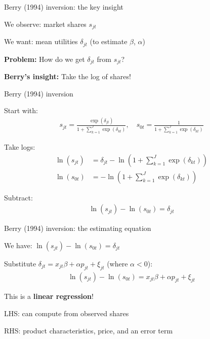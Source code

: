 \documentclass[notes,11pt, aspectratio=169]{beamer}
\newenvironment{wideitemize}{\itemize\addtolength{\itemsep}{10pt}}{\enditemize}
\begin{document}
\begin{frame}{Berry (1994) inversion: the key insight}
	\begin{wideitemize}
		\item We observe: market shares $s_{jt}$
		\item We want: mean utilities $\delta_{jt}$ (to estimate $\beta$, $\alpha$)
		\item \textbf{Problem:} How do we get $\delta_{jt}$ from $s_{jt}$?
		\item \textbf{Berry's insight:} Take the log of shares!
	\end{wideitemize}
\end{frame}

\begin{frame}{Berry (1994) inversion}
	\begin{wideitemize}
		\item Start with:
		\begin{align*}
			s_{jt} = \frac{\exp(\delta_{jt})}{1 + \sum_{k=1}^J \exp(\delta_{kt})}, \quad s_{0t} = \frac{1}{1 + \sum_{k=1}^J \exp(\delta_{kt})}
		\end{align*}
		\item Take logs:
		\begin{align*}
			\ln(s_{jt}) &= \delta_{jt} - \ln\left(1 + \sum_{k=1}^J \exp(\delta_{kt})\right) \\
			\ln(s_{0t}) &= -\ln\left(1 + \sum_{k=1}^J \exp(\delta_{kt})\right)
		\end{align*}
		\item Subtract:
		\begin{align*}
			\ln(s_{jt}) - \ln(s_{0t}) = \delta_{jt}
		\end{align*}
	\end{wideitemize}
\end{frame}

\begin{frame}{Berry (1994) inversion: the estimating equation}
	\begin{wideitemize}
		\item We have: $\ln(s_{jt}) - \ln(s_{0t}) = \delta_{jt}$
		\item Substitute $\delta_{jt} = x_{jt} \beta + \alpha p_{jt} + \xi_{jt}$ (where $\alpha < 0$):
		\begin{align*}
			\ln(s_{jt}) - \ln(s_{0t}) = x_{jt} \beta + \alpha p_{jt} + \xi_{jt}
		\end{align*}
		\item This is a \textbf{linear regression}!
		\item LHS: can compute from observed shares
		\item RHS: product characteristics, price, and an error term
	\end{wideitemize}
\end{frame}
\end{document}
